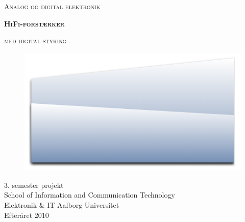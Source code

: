 \begin{center}
\textsc{\huge Analog og digital elektronik\\}
\vspace{20 mm}

\textsc{\textbf{\HUGE HiFi-forstærker}}
\vspace{5 mm}

\textsc{\Large med digital styring\\}

\begin{figure}[h]
\centering
\includegraphics[scale=0.5]{forside.png}


\end{figure}

\begin{flushright}
3. semester projekt \\
School of Information and Communication Technology \\
Elektronik \& IT Aalborg Universitet \\
Efteråret 2010 \\
\end{flushright}


\end{center}